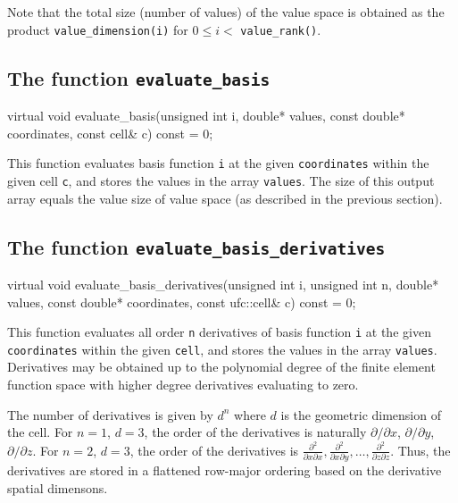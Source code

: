 Note that the total size (number of values) of the value space is
obtained as the product \texttt{value\_dimension(i)} for $0 \le i <$
\texttt{value\_rank()}.

\subsection{The function \texttt{evaluate\_basis}}

\begin{code}
virtual void evaluate_basis(unsigned int i,
                            double* values,
                            const double* coordinates,
                            const cell& c) const = 0;
\end{code}

This function evaluates basis function \texttt{i} at the given
\texttt{coordinates} within the given cell \texttt{c}, and stores the
values in the array \texttt{values}. The size of this output array
equals the value size of value space (as described in the previous
section).

\subsection{The function \texttt{evaluate\_basis\_derivatives}}

\begin{code}
virtual void evaluate_basis_derivatives(unsigned int i,
                                        unsigned int n,
                                        double* values,
                                        const double* coordinates,
                                        const ufc::cell& c) const = 0;
\end{code}

This function evaluates all order \texttt{n} derivatives of basis
function \texttt{i} at the given \texttt{coordinates} within the given
\texttt{cell}, and stores the values in the array \texttt{values}.
Derivatives may be obtained up to the polynomial degree of the finite
element function space with higher degree derivatives evaluating to
zero.

The number of derivatives is given by $d^n$ where $d$ is the geometric
dimension of the cell. For $n = 1$, $d = 3$, the order of the
derivatives is naturally $\partial/\partial x$, $\partial/\partial y$,
$\partial/\partial z$. For $n = 2$, $d = 3$, the order of the
derivatives is $\frac{\partial^2}{\partial x\partial x},
\frac{\partial^2}{\partial x\partial y}, \ldots,
\frac{\partial^2}{\partial z\partial z}$. Thus, the derivatives are
stored in a flattened row-major ordering based on the derivative
spatial dimensons.


